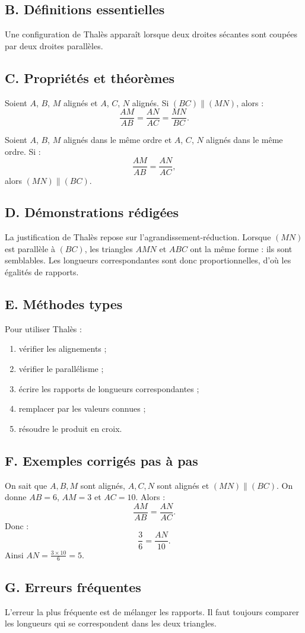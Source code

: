 \documentclass[11pt,a4paper]{article}
\newcommand{\defs}{\subsection*{B. Définitions essentielles}}
\newcommand{\props}{\subsection*{C. Propriétés et théorèmes}}
\newcommand{\demos}{\subsection*{D. Démonstrations rédigées}}
\newcommand{\methodes}{\subsection*{E. Méthodes types}}
\newcommand{\exemples}{\subsection*{F. Exemples corrigés pas à pas}}
\newcommand{\erreurs}{\subsection*{G. Erreurs fréquentes}}
\begin{document}
\defs
\begin{definitionbox}
Une configuration de Thalès apparaît lorsque deux droites sécantes sont coupées par deux droites parallèles.
\end{definitionbox}

\props
\begin{proprietebox}[title=Théorème de Thalès]
Soient $A$, $B$, $M$ alignés et $A$, $C$, $N$ alignés. Si $(BC)\parallel(MN)$, alors :
\[
\frac{AM}{AB}=\frac{AN}{AC}=\frac{MN}{BC}.
\]
\end{proprietebox}

\begin{proprietebox}[title=Réciproque de Thalès]
Soient $A$, $B$, $M$ alignés dans le même ordre et $A$, $C$, $N$ alignés dans le même ordre. Si :
\[
\frac{AM}{AB}=\frac{AN}{AC},
\]
alors $(MN)\parallel(BC)$.
\end{proprietebox}

\demos
\begin{preuvebox}
La justification de Thalès repose sur l'agrandissement-réduction. Lorsque $(MN)$ est parallèle à $(BC)$, les triangles $AMN$ et $ABC$ ont la même forme : ils sont semblables. Les longueurs correspondantes sont donc proportionnelles, d'où les égalités de rapports.
\end{preuvebox}

\methodes
\begin{methodebox}
Pour utiliser Thalès :
\begin{enumerate}
\item vérifier les alignements ;
\item vérifier le parallélisme ;
\item écrire les rapports de longueurs correspondantes ;
\item remplacer par les valeurs connues ;
\item résoudre le produit en croix.
\end{enumerate}
\end{methodebox}

\exemples
\begin{exemplebox}
On sait que $A,B,M$ sont alignés, $A,C,N$ sont alignés et $(MN)\parallel(BC)$. On donne $AB=6$, $AM=3$ et $AC=10$. Alors :
\[
\frac{AM}{AB}=\frac{AN}{AC}.
\]
Donc :
\[
\frac{3}{6}=\frac{AN}{10}.
\]
Ainsi $AN=\frac{3\times10}{6}=5$.
\end{exemplebox}

\erreurs
\begin{attentionbox}
L'erreur la plus fréquente est de mélanger les rapports. Il faut toujours comparer les longueurs qui se correspondent dans les deux triangles.
\end{attentionbox}
\end{document}
